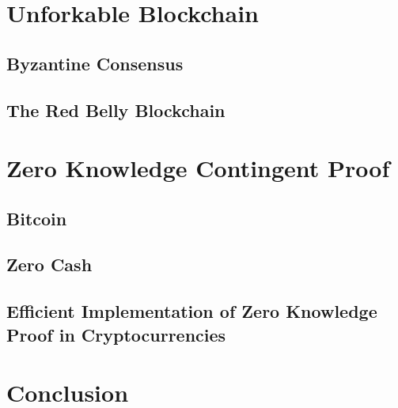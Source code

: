 \documentclass[12pt]{article}
\begin{document}
\section{Unforkable Blockchain}
\label{sec:Unforkable Blockchain}

\subsection{Byzantine Consensus}

\subsection{The Red Belly Blockchain}

\section{Zero Knowledge Contingent Proof}
\label{sec:Zero Knowledge Contingent Proof}

\subsection{Bitcoin}

\subsection{Zero Cash}

\subsection{Efficient Implementation of Zero Knowledge Proof in Cryptocurrencies}

\section{Conclusion}

\newpage


\end{document}
